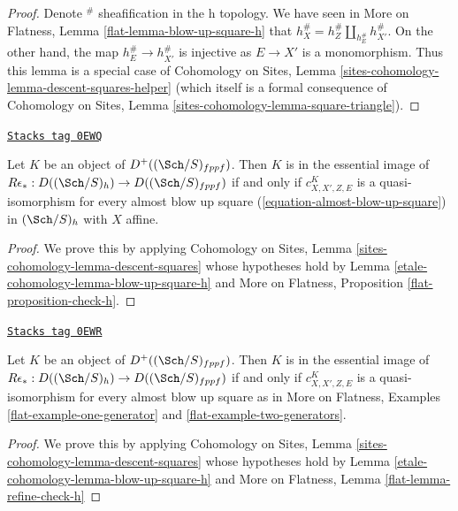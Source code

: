 \begin{proof}
Denote ${}^\#$ sheafification in the h topology.
We have seen in More on Flatness, Lemma \ref{flat-lemma-blow-up-square-h}
that $h_X^\# = h_Z^\# \amalg_{h_E^\#} h_{X'}^\#$. On the other hand,
the map $h_E^\# \to h_{X'}^\#$ is injective as $E \to X'$ is a
monomorphism. Thus this lemma is a special case of
Cohomology on Sites, Lemma \ref{sites-cohomology-lemma-descent-squares-helper}
(which itself is a formal consequence of
Cohomology on Sites, Lemma \ref{sites-cohomology-lemma-square-triangle}).
\end{proof}

\begin{proposition}[Check h]
\label{etale-cohomology-proposition-check-h}
\href{https://stacks.math.columbia.edu/tag/0EWQ}{\texttt{Stacks tag 0EWQ}}

Let $K$ be an object of $D^+((\Sch/S)_{fppf})$.
Then $K$ is in the essential image of
$R\epsilon_* : D((\Sch/S)_h) \to D((\Sch/S)_{fppf})$
if and only if $c^K_{X, X', Z, E}$ is a quasi-isomorphism
for every almost blow up square (\ref{equation-almost-blow-up-square})
in $(\Sch/S)_h$ with $X$ affine.
\end{proposition}

\begin{proof}
We prove this by applying
Cohomology on Sites, Lemma \ref{sites-cohomology-lemma-descent-squares}
whose hypotheses hold by
Lemma \ref{etale-cohomology-lemma-blow-up-square-h} and
More on Flatness, Proposition \ref{flat-proposition-check-h}.
\end{proof}

\begin{lemma}
\label{etale-cohomology-lemma-refine-check-h}
\href{https://stacks.math.columbia.edu/tag/0EWR}{\texttt{Stacks tag 0EWR}}

Let $K$ be an object of $D^+((\Sch/S)_{fppf})$. Then $K$ is in the
essential image of $R\epsilon_* : D((\Sch/S)_h) \to D((\Sch/S)_{fppf})$
if and only if $c^K_{X, X', Z, E}$ is a quasi-isomorphism
for every almost blow up square as in
More on Flatness, Examples \ref{flat-example-one-generator} and
\ref{flat-example-two-generators}.
\end{lemma}

\begin{proof}
We prove this by applying
Cohomology on Sites, Lemma \ref{sites-cohomology-lemma-descent-squares}
whose hypotheses hold by
Lemma \ref{etale-cohomology-lemma-blow-up-square-h} and
More on Flatness, Lemma \ref{flat-lemma-refine-check-h}
\end{proof}

